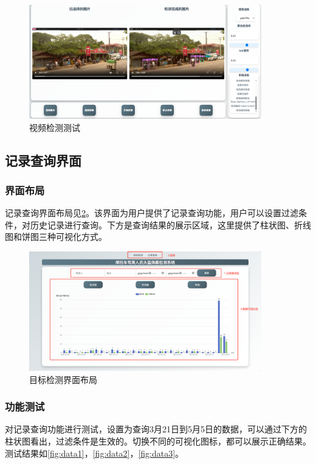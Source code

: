 \begin{figure}[!htb]
    \centering
    \includegraphics[width=0.9\textwidth]{figs/chap05/video.png}
    \caption{视频检测测试}
    \label{fig:video}
\end{figure}

\subsection{记录查询界面}
\subsubsection{界面布局}
记录查询界面布局见\ref{fig:search}。该界面为用户提供了记录查询功能，用户可以设置过滤条件，对历史记录进行查询。下方是查询结果的展示区域，这里提供了柱状图、折线图和饼图三种可视化方式。

\begin{figure}[!htb]
    \centering
    \includegraphics[width=0.9\textwidth]{figs/chap05/search.png}
    \caption{目标检测界面布局}
    \label{fig:search}
\end{figure}

\subsubsection{功能测试}
对记录查询功能进行测试，设置为查询3月21日到5月5日的数据，可以通过下方的柱状图看出，过滤条件是生效的。切换不同的可视化图标，都可以展示正确结果。测试结果如\ref{fig:data1}，\ref{fig:data2}，\ref{fig:data3}。

